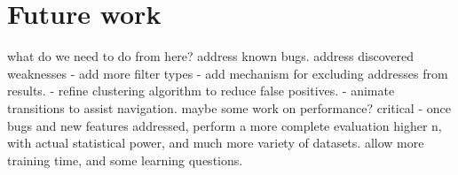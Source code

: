 \section{Future work}
what do we need to do from here?
address known bugs.
address discovered weaknesses
 - add more filter types
 - add mechanism for excluding addresses from results.
 - refine clustering algorithm to reduce false positives. 
 - animate transitions to assist navigation.
maybe some work on performance?
critical - once bugs and new features addressed, perform a more complete evaluation
higher n, with actual statistical power, and much more variety of datasets. allow more training time, and some learning questions.